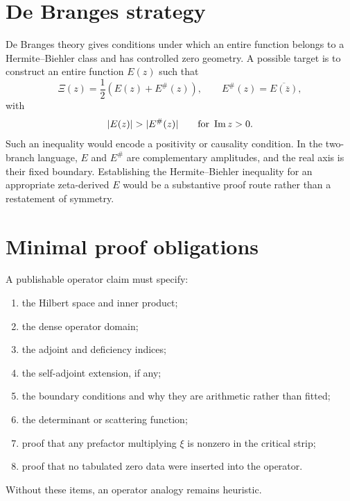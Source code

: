 \section{De Branges strategy}
De Branges theory gives conditions under which an entire function belongs to a Hermite--Biehler class and has controlled zero geometry. A possible target is to construct an entire function $E(z)$ such that
\begin{equation}
\Xi(z)=\frac12\left(E(z)+E^{\#}(z)\right),
\qquad
E^{\#}(z)=\overline{E(\overline z)},
\end{equation}
with
\begin{equation}
|E(z)|>|E^{\#}(z)|
\qquad \text{for }\Imm z>0.
\end{equation}
Such an inequality would encode a positivity or causality condition. In the two-branch language, $E$ and $E^{\#}$ are complementary amplitudes, and the real axis is their fixed boundary. Establishing the Hermite--Biehler inequality for an appropriate zeta-derived $E$ would be a substantive proof route rather than a restatement of symmetry.

\section{Minimal proof obligations}
A publishable operator claim must specify:
\begin{enumerate}
\item the Hilbert space and inner product;
\item the dense operator domain;
\item the adjoint and deficiency indices;
\item the self-adjoint extension, if any;
\item the boundary conditions and why they are arithmetic rather than fitted;
\item the determinant or scattering function;
\item proof that any prefactor multiplying $\xi$ is nonzero in the critical strip;
\item proof that no tabulated zero data were inserted into the operator.
\end{enumerate}
Without these items, an operator analogy remains heuristic.






